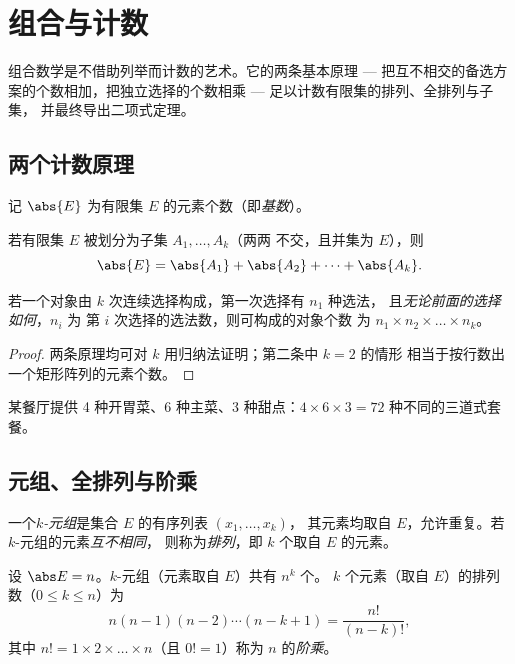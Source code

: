 \chapter{组合与计数}\label{ch:g12:comb}

组合数学是不借助列举而计数的艺术。它的两条基本原理 ---
把互不相交的备选方案的个数相加，把独立选择的个数相乘 ---
足以计数有限集的排列、全排列与子集，
并最终导出二项式定理。

\section{两个计数原理}

记 $\abs{E}$ 为有限集
$E$ 的元素个数（即\emph{基数}）。

\begin{proposition}[加法原理]\label{prop:g12:comb:addition}
若有限集 $E$ 被划分为子集 $A_1, \dots, A_k$（两两
不交，且并集为 $E$），则
\[
\abs{E} = \abs{A_1} + \abs{A_2} + \dots + \abs{A_k}.
\]
\end{proposition}

\begin{proposition}[乘法原理]\label{prop:g12:comb:multiplication}
若一个对象由 $k$ 次连续选择构成，第一次选择有 $n_1$ 种选法，
且\emph{无论前面的选择如何}，$n_i$ 为
第 $i$ 次选择的选法数，则可构成的对象个数
为 $n_1 \times n_2 \times \dots \times n_k$。
\end{proposition}

\begin{proof}
两条原理均可对 $k$ 用归纳法证明；第二条中 $k = 2$ 的情形
相当于按行数出一个矩形阵列的元素个数。
\end{proof}

\begin{example}
某餐厅提供 4 种开胃菜、6 种主菜、3 种甜点：$4 \times 6 \times 3 =
72$ 种不同的三道式套餐。
\end{example}

\section{元组、全排列与阶乘}

\begin{definition}[$k$-元组]\label{def:g12:comb:tuples}
一个\emph{$k$-元组}是集合 $E$ 的有序列表 $(x_1, \dots, x_k)$，
其元素均取自 $E$，允许重复。若 $k$-元组的元素\emph{互不相同}，
则称为\emph{排列}，即 $k$ 个取自 $E$ 的元素。
\end{definition}

\begin{proposition}\label{prop:g12:comb:tuples}
设 $\abs E = n$。$k$-元组（元素取自 $E$）共有 $n^k$ 个。
$k$ 个元素（取自 $E$）的排列数（$0 \leq k \leq n$）为
\[
n(n-1)(n-2)\cdots(n-k+1) = \frac{n!}{(n-k)!},
\]
其中 $n! = 1 \times 2 \times \dots \times n$（且 $0! = 1$）称为
$n$ 的\emph{阶乘}。
\end{proposition}


